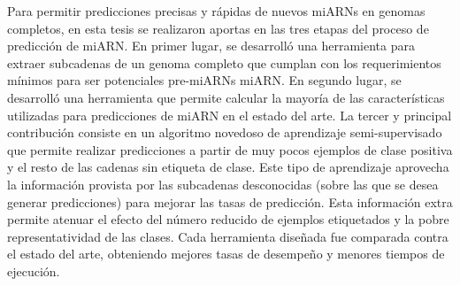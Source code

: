 Para permitir predicciones precisas y rápidas de nuevos miARNs en genomas completos, en esta tesis se realizaron aportas en las tres etapas del proceso de
predicción de miARN.  En primer lugar, se desarrolló una herramienta para extraer subcadenas de un genoma completo que cumplan con los requerimientos mínimos
para ser potenciales pre-miARNs miARN. En segundo lugar, se desarrolló una herramienta que permite calcular la mayoría de las características utilizadas para
predicciones de miARN en el estado del arte. La tercer y principal contribución consiste en un algoritmo novedoso de aprendizaje semi-supervisado que permite
realizar predicciones a partir de muy pocos ejemplos de clase positiva y el resto de las cadenas sin etiqueta de clase. Este tipo de aprendizaje aprovecha la
información provista por las subcadenas desconocidas (sobre las que se desea generar predicciones) para mejorar las tasas de predicción. Esta información extra
permite atenuar el efecto del número reducido de ejemplos etiquetados y la pobre representatividad de las clases. Cada herramienta diseñada fue comparada contra
el estado del arte, obteniendo mejores tasas de desempeño y menores tiempos de ejecución.

\newpage
\thispagestyle{empty}
